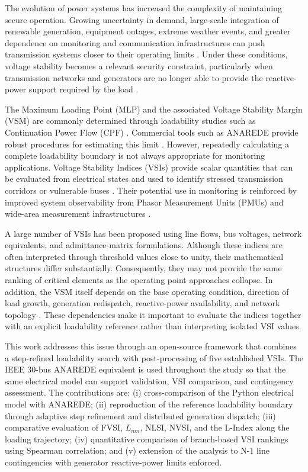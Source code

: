 \documentclass[conference]{IEEEtran}
\begin{document}
The evolution of power systems has increased the complexity of maintaining secure operation. Growing uncertainty in demand, large-scale integration of renewable generation, equipment outages, extreme weather events, and greater dependence on monitoring and communication infrastructures can push transmission systems closer to their operating limits \cite{Bhusal2020,Pastrana2025,Rifat2025,Manias2024}. Under these conditions, voltage stability becomes a relevant security constraint, particularly when transmission networks and generators are no longer able to provide the reactive-power support required by the load \cite{Hatziargyriou2021,kundur1994power}.

The Maximum Loading Point (MLP) and the associated Voltage Stability Margin (VSM) are commonly determined through loadability studies such as Continuation Power Flow (CPF) \cite{Ajjarapu1992}. Commercial tools such as ANAREDE provide robust procedures for estimating this limit \cite{cepel2009anarede}. However, repeatedly calculating a complete loadability boundary is not always appropriate for monitoring applications. Voltage Stability Indices (VSIs) provide scalar quantities that can be evaluated from electrical states and used to identify stressed transmission corridors or vulnerable buses \cite{modarresi2016comprehensive}. Their potential use in monitoring is reinforced by improved system observability from Phasor Measurement Units (PMUs) and wide-area measurement infrastructures \cite{Pierrou2024,Su2018,Pourbagher2022}.

A large number of VSIs has been proposed using line flows, bus voltages, network equivalents, and admittance-matrix formulations. Although these indices are often interpreted through threshold values close to unity, their mathematical structures differ substantially. Consequently, they may not provide the same ranking of critical elements as the operating point approaches collapse. In addition, the VSM itself depends on the base operating condition, direction of load growth, generation redispatch, reactive-power availability, and network topology \cite{Bento2018b}. These dependencies make it important to evaluate the indices together with an explicit loadability reference rather than interpreting isolated VSI values.

This work addresses this issue through an open-source framework that combines a step-refined loadability search with post-processing of five established VSIs. The IEEE 30-bus ANAREDE equivalent is used throughout the study so that the same electrical model can support validation, VSI comparison, and contingency assessment. The contributions are: (i) cross-comparison of the Python electrical model with ANAREDE; (ii) reproduction of the reference loadability boundary through adaptive step refinement and distributed generation dispatch; (iii) comparative evaluation of FVSI, $L_{mn}$, NLSI, NVSI, and the L-Index along the loading trajectory; (iv) quantitative comparison of branch-based VSI rankings using Spearman correlation; and (v) extension of the analysis to N-1 line contingencies with generator reactive-power limits enforced.
\end{document}
